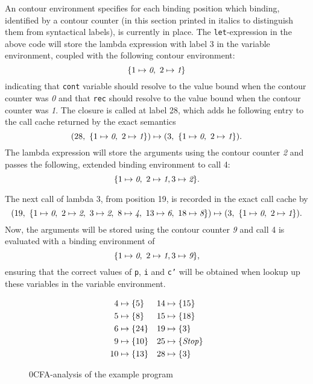 \documentclass[a4paper,halfparskip,DIV=10,11pt]{scrbook}
\begin{document}
An contour environment specifies for each binding position which binding, identified by a contour counter (in this section printed in italics to distinguish them from syntactical labels), is currently in place. The \texttt{let}-expression in the above code will store the lambda expression with label 3 in the variable environment, coupled with the following contour environment:
\[
\{ 1 \mapsto \textit 0,\ 2 \mapsto \textit 1 \}
\]
indicating that \texttt{cont} variable should resolve to the value bound when the contour counter was \textit 0 and that \texttt{rec} should resolve to the value bound when the contour counter was \textit 1. The closure is called at label 28, which adds he following entry to the call cache returned by the exact semantics
\[
(28,\ \{ 1 \mapsto \textit 0,\ 2 \mapsto \textit 1 \}) \mapsto (3,\ \{ 1 \mapsto \textit 0,\ 2 \mapsto \textit 1 \}).
\]
The lambda expression will store the arguments using the contour counter \textit 2 and passes the following, extended binding environment to call 4:
\[
\{ 1 \mapsto \textit 0,\ 2 \mapsto \textit 1, 3 \mapsto \textit 2\}.
\]

The next call of lambda 3, from position 19, is recorded in the exact call cache by
\[
(19,\ \{ 1\mapsto \textit 0,\ 2\mapsto \textit 2,\ 3\mapsto \textit 2,\ 8\mapsto \textit 4,\ 13\mapsto \textit 6,\ 18\mapsto \textit 8\}) \mapsto (3,\ \{ 1 \mapsto \textit 0,\ 2 \mapsto \textit 1 \}).
\]
Now, the arguments will be stored using the contour counter \textit 9 and call 4 is evaluated with a binding environment of 
\[
\{ 1 \mapsto \textit 0,\ 2 \mapsto \textit 1, 3 \mapsto \textit 9\},
\]
ensuring that the correct values of \texttt{p}, \texttt{i} and \texttt{c'} will be obtained when lookup up these variables in the variable environment.

\begin{figure}
\begin{framed}
\vspace{-1em}
\begin{align*}
4 &\mapsto \{5\}
& 14 &\mapsto \{15\}\\
5 &\mapsto \{8\}
& 15 &\mapsto \{18\}\\
6 &\mapsto \{24\}
& 19 &\mapsto \{3\}\\
9 &\mapsto \{10\}
& 25 &\mapsto \{\text{\textit{Stop}}\}\\
10 &\mapsto \{13\}
& 28 &\mapsto \{3\}
\end{align*}
\end{framed}
\caption{0CFA-analysis of the example program}
\label{fig:examplecfa0}
\end{figure}
\end{document}
